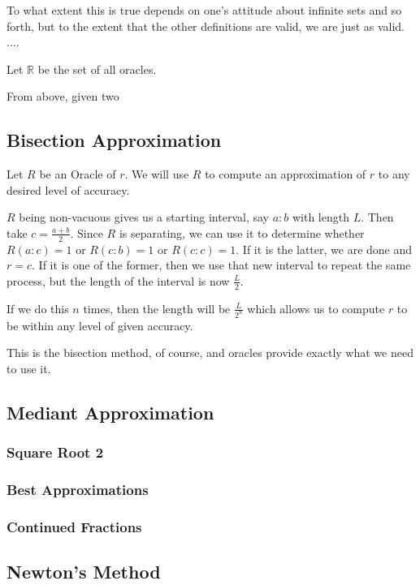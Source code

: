 \documentclass[12pt]{article}
\theoremstyle{remark}
\begin{document}
To what extent this is true depends on one's attitude about infinite sets and so forth, but to the extent that the other definitions are valid, we are just as valid. ....

Let $\mathbb{R}$ be the set of all oracles. 

From above, given two 

\subsection{Bisection Approximation}

Let $R$ be an Oracle of $r$. We will use $R$ to compute an approximation of $r$ to any desired level of accuracy.

$R$ being non-vacuous gives us a starting interval, say $a:b$ with length $L$. Then take $c = \frac{a+b}{2}$. Since $R$ is separating, we can use it to determine whether $R(a:c) = 1$ or $R(c:b) = 1$ or $R(c:c) = 1$. If it is the latter, we are done and $r = c$. If it is one of the former, then we use that new interval to repeat the same process, but the length of the interval is now $\frac{L}{2}$. 

If we do this $n$ times, then the length will be $\frac{L}{2^n}$ which allows us to compute $r$ to be within any level of given accuracy. 

This is the bisection method, of course, and oracles provide exactly what we need to use it. 

\subsection{Mediant Approximation}

\subsubsection{Square Root 2}

\subsubsection{Best Approximations}

\subsubsection{Continued Fractions}

\subsection{Newton's Method}
\end{document}
